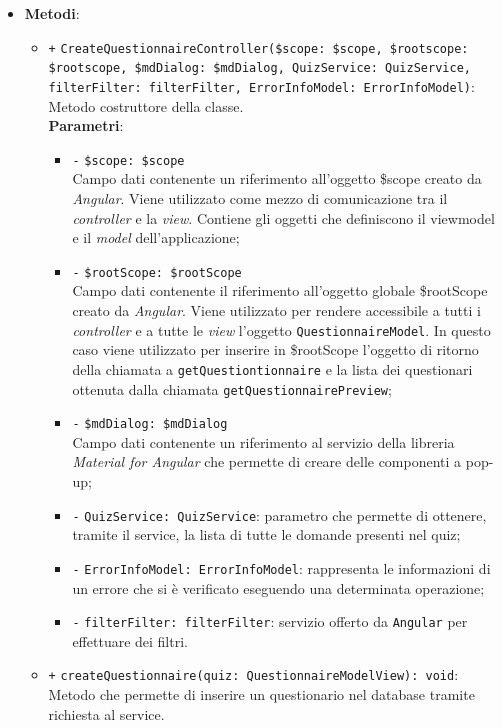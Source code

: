 \begin{itemize}
\begin{itemize}
		
	\end{itemize}
	\item \textbf{Metodi}:
	\begin{itemize}
		\item \texttt{+} \texttt{CreateQuestionnaireController(\$scope: \$scope, \$rootscope: \$rootscope, \$mdDialog: \$mdDialog, QuizService: QuizService, filterFilter: filterFilter, ErrorInfoModel: ErrorInfoModel)}: \\ Metodo costruttore della classe. \\
		\textbf{Parametri}:
		\begin{itemize}
			\item \texttt{-} \texttt{\$scope: \$scope} \\
			Campo dati contenente un riferimento all'oggetto \$scope creato da \textit{Angular}. Viene utilizzato come mezzo di comunicazione tra il \textit{controller} e la \textit{view}. Contiene gli oggetti che definiscono il viewmodel e il \textit{model} dell'applicazione;
				\item \texttt{-} \texttt{\$rootScope: \$rootScope} \\
				Campo dati contenente il riferimento all'oggetto globale \$rootScope creato da \textit{Angular}. Viene utilizzato per rendere accessibile a tutti i \textit{controller} e a tutte le \textit{view} l'oggetto \texttt{QuestionnaireModel}. In questo caso viene utilizzato per inserire in \$rootScope l'oggetto di ritorno della chiamata a \texttt{getQuestiontionnaire} e la lista dei questionari ottenuta dalla chiamata \texttt{getQuestionnairePreview};
			\item \texttt{-} \texttt{\$mdDialog: \$mdDialog} \\
			Campo dati contenente un riferimento al servizio della libreria \textit{Material for Angular} che permette di creare delle componenti a pop-up;
			\item \texttt{-} \texttt{QuizService: QuizService}: parametro che permette di ottenere, tramite il service, la lista di tutte le domande presenti nel quiz;
			\item \texttt{-} \texttt{ErrorInfoModel: ErrorInfoModel}: rappresenta le informazioni di un errore che si è verificato eseguendo una determinata operazione;
			\item \texttt{-} \texttt{filterFilter: filterFilter}: servizio offerto da \texttt{Angular} per effettuare dei filtri.
		\end{itemize}
		\item \texttt{+} \texttt{createQuestionnaire(quiz: QuestionnaireModelView): void}: \\Metodo che permette di inserire un questionario nel database tramite richiesta al service. \\

\end{itemize}
\end{itemize}
